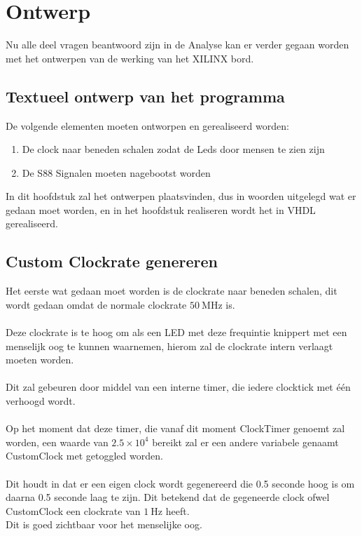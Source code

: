 \chapter{Ontwerp}

Nu alle deel vragen beantwoord zijn in de Analyse kan er verder gegaan worden met het ontwerpen van de werking van het XILINX bord.

\section{Textueel ontwerp van het programma}

De volgende elementen moeten ontworpen en gerealiseerd worden:
\begin{enumerate}
	\item De clock naar beneden schalen zodat de Leds door mensen te zien zijn
	\item De S88 Signalen moeten nagebootst worden
\end{enumerate}

In dit hoofdstuk zal het ontwerpen plaatsvinden, dus in woorden uitgelegd wat er gedaan moet worden, en in het hoofdstuk realiseren wordt het in VHDL gerealiseerd.

\clearpage
\section{Custom Clockrate genereren}

Het eerste wat gedaan moet worden is de clockrate naar beneden schalen, dit wordt gedaan omdat de normale clockrate $\SI{50}{\mega\hertz} $ is.
\\\\
Deze clockrate is te hoog om als een LED met deze frequintie knippert met een menselijk oog te kunnen waarnemen, hierom zal de clockrate intern verlaagt moeten worden.
\\\\
Dit zal gebeuren door middel van een interne timer, die iedere clocktick met één verhoogd wordt.
\\\\
Op het moment dat deze timer, die vanaf dit moment ClockTimer genoemt zal worden, een waarde van ${2.5} \times {10}^4$ bereikt zal er een andere variabele genaamt CustomClock met getoggled worden.
\\\\
Dit houdt in dat er een eigen clock wordt gegenereerd die 0.5 seconde hoog is om daarna 0.5 seconde laag te zijn. Dit betekend dat de gegeneerde clock ofwel CustomClock een clockrate van $\SI{1}{\hertz}$ heeft. 
\\
Dit is goed zichtbaar voor het menselijke oog.
\clearpage
